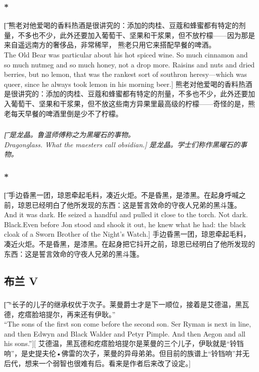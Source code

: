 \documentclass[12pt,a4paper]{article}
\begin{document}
\subsubsection{\color{red}*}\t[
	熊老对他爱喝的香料热酒是很讲究的：添加的肉桂、豆蔻和蜂蜜都有特定的剂量，不多也不少，此外还要加入葡萄干、坚果和干浆果，但不放柠檬——因为那是来自遥远南方的奢侈品，非常稀罕，	熊老只用它来搭配早餐的啤酒。\\
	The Old Bear was particular about his hot spiced wine. So much cinnamon and so much nutmeg and so much honey, not a drop more. Raisins and nuts and dried berries, but no lemon, that was the rankest sort of southron heresy—which was queer, since he always took lemon in his morning beer.]
	熊老对他爱喝的香料热酒是很讲究的：添加的肉桂、豆蔻和蜂蜜都有特定的剂量，不多也不少，此外还要加入葡萄干、坚果和干浆果，但不放这些南方异果里最高级的柠檬——奇怪的是，熊老每天早餐的啤酒里倒是少不了柠檬。

\subsubsection{}\emph{\t[
	是龙晶。鲁温师傅称之为黑曜石的事物。\\
	Dragonglass. What the maesters call obsidian.]
	是龙晶。学士们称作黑曜石的事物。}
	
\subsubsection{\color{red}*}\t[	
	手边昏黑一团，琼恩牵起毛料，凑近火炬。不是昏黑，是漆黑。在起身呼喊之前，琼恩已经明白了他所发现的东西：这是誓言效命的守夜人兄弟的黑斗篷。\\
	And it was dark. He seized a handful and pulled it close to the torch. Not dark. Black.Even before Jon stood and shook it out, he knew what he had: the black cloak of a Sworn Brother of the Night's Watch.]
	手边昏黑一团，琼恩牵起毛料，凑近火炬。不是昏黑，是漆黑。在起身把它抖开之前，琼恩已经明白了他所发现的东西：这是誓言效命的守夜人兄弟的黑斗篷。
	
\subsection{布兰 V}
\subsubsection{}\t[
	“长子的儿子的继承权优于次子。莱曼爵士才是下一顺位，接着是艾德温，黑瓦德，疙瘩脸培提尔，再来还有伊耿。”\\
	“The sons of the first son come before the second son. Ser Ryman is next in line, and then Edwyn and Black Walder and Petyr Pimple. And then Aegon and all his sons.”][
	艾德温，黑瓦德和疙瘩脸培提尔是莱曼的三个儿子，伊耿就是“铃铛响”，是史提夫伦•佛雷的次子，莱曼的异母弟弟。但目前的族谱上“铃铛响”并无后代，想来一个弱智也很难有后。看来是作者后来改了设定。]
	
\end{document}
